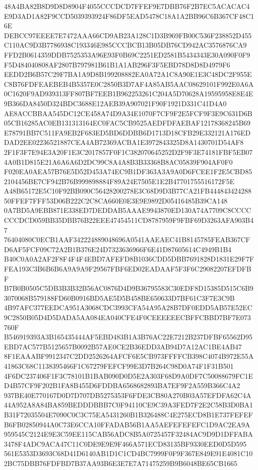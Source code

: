 \documentclass[UTF8,fontset=fandol,zihao=-4,a4paper]{ctexart}
\begin{document}
{{48A4BA82B8D9D8D8904F4055CCCDCD7FFEF9E7DBB76F2B7EC5ACACAC4E9D3AD1A82F9CCD5039393924F86DF5EAD5478C18A1A2BB96C6B367CF48C16E
DEBCC97EEEE7E7472AAA66CD9AB23A128C1D3B969FB00C536F238852D455C110AC9D3B7786938C193346E985CCCBCB13B05DB76CD942AC3576876CA9
FFD2B0614359DDB7525353A96E93F0B69C2251ED2581B5434343E30A090F0F9F5D484040808AF2807B797981B61B1A1AB296F3F5EBD78D8D8D4979F6
EEDD2B6B57C29F7BA1A9D8B199208882EA0A72A1C8A90E1E3C48DC2F955EC8B76FDFEAEBEB4B5357E0C2850B3D7AF4A85AB5AAC08629101F992E0A6A
0C1620F9AD939313FF807BF7EEB1B962253261C204A5D70628A19595958E8E4E9B366DA8450D324BDC3688E12AEB39A907021F90F1921D331C41D4A0
AE8ACCBBAA545DC12CE458A74D9A34E1070F7CF9F2E5FCF9F3E9C631D6B05CB16285AC0EB131313164EC0FAC5CB9525AEDFDFAEBAF12178368245B69
E78791BB7C511FA9EB2F683ED5BD6DDBB6D1713D18CFB29E332121A176EDDAD2EE02236521887CEA4AB72369ACBA1E3972843325D8A1430701D54AF8
2F1F3F7E94E3A20F1E3C2017857F0F1C382070645252D2F9F3E74181FBF5EB074A0B1D815E21A6A6A6D2DC99C8A4A8B3B33368B8AC05839F904AF0F0
F020EA0AEA57B76E5D52D453A74EC9B1DF363A3A9A0D6FCEE1F2E5CBD852104456BE7CF942B76B999898884F89A24E7505E1E2B47701755516172F5E
A48B65172E5C10F92BB090C56428200278E3C68D9D3B77CA21FB44484342428850FFEF7FFF53D06B222C2C8CA660E0E3E9E9892D05416485B39CA148
0A7BD5A9EBB871E338ED7DEDDAB5AAAE9943870ED130A74A7709C8CCCCCCCDCD059BB35DBB76B22EEE47454511CD8787959F9FBF69D3263AFA903B47
76404080C0ECB1AAF342224889048696A0541AAEAEC41B8145785FEAB367CFD6AF5FCF09C72A2B1B376E24D7323636966F6E41D87605614C4949B1B4
B40C0A0A2AF2F8F4F4F4EBD7AFEFD8B1036CDD5DBB7691828D1831E29F7FFEA193C3B6B6B6A9A9A9F29567FBF6ED02EADAAF5F3F6C29082207EFDFBF
B7B0B0505C5DB3B3B32B56AC0876D4D9B36795583C30EDF8D15385D515C6B93070068B579188FD60B0916BD5AE5D5B458BE650633D7BF61C3F7E3C9B
4B97AFC377EEDCA951A3068CDC3993CFA54A95A28B7DF0EDD5AB57E52EC9C2850B05D4D5DADA5AA084EA040CFE4F0CEEEEEECBFFCBBD7BF7E073760F
B546919393A3B165435444AF5EBD483B1A3B76AC22E7212B237DFBF65562D95EBD7AC577B5125657B0092B57AE0CE2B36EDD3AB94D7A12AC1BE4AB47
8F1EAAABF9912347C2DD2526264AFCF6E5CB973FFFFCB398C4074B972E55A41863C68C1138395466F1C67279FEFCF99E3D7B264C98D0A74F1F31B501
4F6DC237406F1F3C78101B1BAB090D0D5E2A303F68D9A0DF7C50088679FC1ED4B57CF9F202B1FA8B455D6FDDBA6568682893BA7EF9F2A559B366C4A2
937BE40E770167D0D7D707DB5275353F6FDE3CB80A270B03A57EFDFA62C4A44A952A8A84BA859BEDDDBBB7C0F94110CE9C39A3FED7F2E2C58B3D0BA1
B31F72035504E7090C0C3C75EA5431260B1B326488C4E275ECD8B1E737FEFEFB6FB02850944A0C73E6CCA10FFADAB56B1AA5AEFEFEFEFC1D9AC2EA9A
959545C2124E9E3C59EE115CAB56ADC8B5A0725457F32484AC9D9D1DFFABA3478F4ADC9ACA47C11C0DE9E9E9F466A571ECD83135BF9330EED0D5D595
561E5353D3693C68D41D6140AB1D1C1CD4BC7999F0F9F367E849E91E4081C102BC75DBB76FDFBD7B37AA93B6E3E7E7A71475259B9B6048BE65CB1665
}}
\end{document}
